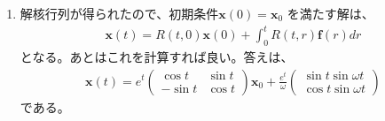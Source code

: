 \documentclass[fleqn]{jsarticle}
\begin{document}
\begin{enumerate}
\item 解核行列が得られたので、初期条件$\boldsymbol{x}(0)=\boldsymbol{x}_{0}$
を満たす解は、
\begin{eqnarray}
\boldsymbol{x}(t)=R(t,0)\boldsymbol{x}(0)
+\int_{0}^{t}R(t,r)\boldsymbol{f}(r)dr
\end{eqnarray}
となる。あとはこれを計算すれば良い。答えは、
\begin{eqnarray}
\boldsymbol{x}(t)=e^{t}\left(
\begin{array}{cc}
\cos t & \sin t\\
-\sin t & \cos t
\end{array}\right)\boldsymbol{x}_{0}
+\frac{e^{t}}{\omega}\left(
\begin{array}{c}
\sin t\sin\omega t\\
\cos t\sin\omega t
\end{array}\right)
\end{eqnarray}
である。
\end{enumerate}
\end{document}
